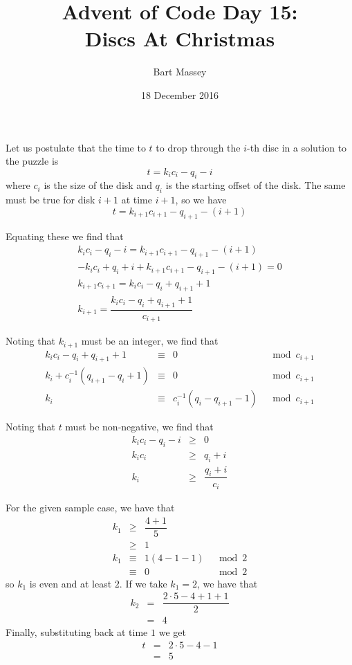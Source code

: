 \documentclass{article}
\title{Advent of Code Day 15:\\
  Discs At Christmas}
\author{Bart Massey}
\date{18 December 2016}
\begin{document}
Let us postulate that the time to $t$ to drop through the $i$-th
disc in a solution to the puzzle is $$
  t = k_i c_i - q_i - i
$$
where $c_i$ is the size of the disk and $q_i$ is the starting
offset of the disk. The same must be true for disk $i + 1$
at time $i + 1$, so we have $$
  t = k_{i+1} c_{i+1} - q_{i+1} - (i + 1)
$$

Equating these we find that $$\begin{array}{l}
  k_i c_i - q_i - i = k_{i+1} c_{i+1} - q_{i+1} - (i + 1) \\
  -k_i c_i + q_i + i + k_{i+1} c_{i+1} - q_{i+1} - (i + 1) = 0 \\
  k_{i+1} c_{i+1} = k_i c_i - q_i + q_{i+1} + 1 \\
  k_{i+1} = \dfrac{k_i c_i - q_i + q_{i+1} + 1}{c_{i+1}}
\end{array}$$

Noting that $k_{i+1}$ must be an integer,
we find that $$\begin{array}{rclr}
  k_i c_i - q_i + q_{i+1} + 1 &\equiv& 0 &\mod c_{i+1} \\
  k_i + c_i^{-1}(q_{i+1} - q_i + 1) &\equiv& 0 &\mod c_{i+1} \\
  k_i &\equiv& c_i^{-1}(q_i - q_{i+1} - 1) &\mod c_{i+1}
\end{array}$$

Noting that $t$ must be non-negative, we find that $$\begin{array}{rcl}
  k_i c_i - q_i - i &\geq& 0 \\
  k_i c_i &\geq& q_i + i \\
  k_i &\geq& \dfrac{q_i + i}{c_i}
\end{array}$$

For the given sample case, we have that $$\begin{array}{rclr}
  k_1 &\geq& \dfrac{4 + 1}{5} \\
      &\geq& 1 \\
  k_1 &\equiv& 1(4 - 1 - 1) &\mod2 \\
      &\equiv& 0 &\mod2
\end{array}$$
so $k_1$ is even and at least $2$. If we take $k_1 = 2$, we have
that $$\begin{array}{rcl}
  k_2 &=& \dfrac{2 \cdot 5 - 4 + 1 + 1}{2} \\
      &=& 4
\end{array}$$
Finally, substituting back at time $1$
we get $$\begin{array}{rclr}
  t &=& 2 \cdot 5 - 4 - 1 \\
    &=& 5 \\
\end{array}$$
\end{document}

